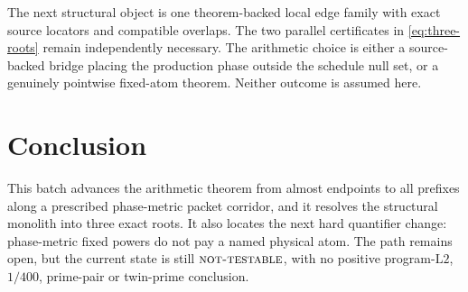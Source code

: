 \documentclass[11pt]{article}
\theoremstyle{definition}
\theoremstyle{remark}
\newcommand{\Ltwo}{\mathrm{L2}}
\newcommand{\NT}{\textnormal{\textsc{not-testable}}}
\begin{document}
The next structural object is one theorem-backed local edge family
with exact source locators and compatible overlaps.  The two parallel
certificates in \eqref{eq:three-roots} remain independently necessary.
The arithmetic choice is either a source-backed bridge placing the
production phase outside the schedule null set, or a genuinely
pointwise fixed-atom theorem.  Neither outcome is assumed here.

\section{Conclusion}

This batch advances the arithmetic theorem from almost endpoints to
all prefixes along a prescribed phase-metric packet corridor, and it
resolves the structural monolith into three exact roots.  It also
locates the next hard quantifier change: phase-metric fixed powers do
not pay a named physical atom.  The path remains open, but the current
state is still \(\NT\), with no positive program-\(\Ltwo\),
\(1/400\), prime-pair or twin-prime conclusion.

\nocite{*}


\end{document}

